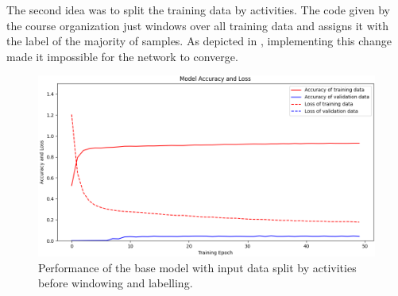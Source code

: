 The second idea was to split the training data by activities. The code given by the course organization just windows over all training data and assigns it with the label of the majority of samples. As depicted in , implementing this change made it impossible for the network to converge.
\begin{figure}[htpb]
\centering
\includegraphics[width=\linewidth]{SplitActivity}
\caption{Performance of the base model with input data split by activities before windowing and labelling.}
\label{myfig:SplitActivity}
\end{figure}

